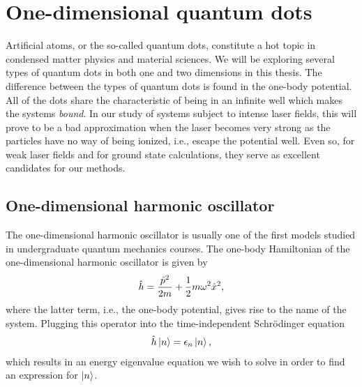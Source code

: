 \section{One-dimensional quantum dots}
    Artificial atoms, or the so-called quantum dots, constitute a hot topic in
    condensed matter physics and material sciences. We will be exploring
    several types of quantum dots in both one and two dimensions in this
    thesis. The difference between the types of quantum dots is found in the
    one-body potential. All of the dots share the characteristic of being in an
    infinite well which makes the systems \emph{bound}. In our study of systems
    subject to intense laser fields, this will prove to be a bad approximation
    when the laser becomes very strong as the particles have no way of being
    ionized, i.e., escape the potential well.  Even so, for weak laser fields
    and for ground state calculations, they serve as excellent candidates for
    our methods.

    \subsection{One-dimensional harmonic oscillator}
        \label{subsec:one-dim-ho}
        The one-dimensional harmonic oscillator is usually one of the first
        models studied in undergraduate quantum mechanics courses.
        The one-body Hamiltonian of the one-dimensional harmonic oscillator is
        given by
        \begin{align}
            \hat{h} = \frac{\hat{p}^2}{2m} + \frac{1}{2} m\omega^2 \hat{x}^2,
            \label{eq:1dho-hamiltonian}
        \end{align}
        where the latter term, i.e., the one-body potential, gives rise to the
        name of the system.
        Plugging this operator into the time-independent Schrödinger equation
        \begin{gather}
            \hat{h}\ket{n} = \epsilon_n\ket{n},
        \end{gather}
        which results in an energy eigenvalue equation we wish to solve in order
        to find an expression for $\ket{n}$.

